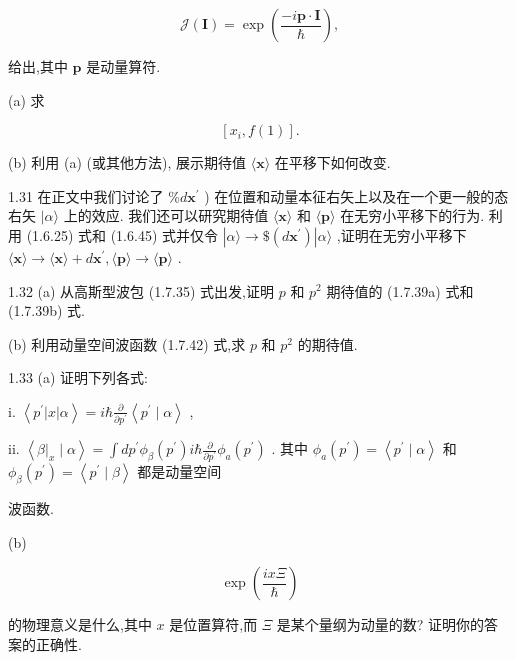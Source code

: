 \documentclass[lang=cn,newtx,10pt,scheme=chinese,thmcnt=section]{elegantbook}
\begin{document}
$$
\mathcal{J}\left( \mathbf{I}\right) = \exp \left( \frac{-i\mathbf{p} \cdot \mathbf{I}}{\hbar }\right) ,
$$

给出,其中 $\mathbf{p}$ 是动量算符.

(a) 求

$$
\left\lbrack {{x}_{i}, f\left( 1\right) }\right\rbrack \text{.}
$$

(b) 利用 (a) (或其他方法), 展示期待值 $\langle \mathbf{x}\rangle$ 在平移下如何改变.

1.31 在正文中我们讨论了 $\% d{\mathbf{x}}^{\prime }$ ) 在位置和动量本征右矢上以及在一个更一般的态右矢 $|\alpha \rangle$ 上的效应. 我们还可以研究期待值 $\langle \mathbf{x}\rangle$ 和 $\langle \mathbf{p}\rangle$ 在无穷小平移下的行为. 利用 (1.6.25) 式和 (1.6.45) 式并仅令 $\left| {\alpha \rangle \rightarrow \$ \left( {d{\mathbf{x}}^{\prime }}\right) }\right| \alpha \rangle$ ,证明在无穷小平移下 $\langle \mathbf{x}\rangle \rightarrow \langle \mathbf{x}\rangle + d{\mathbf{x}}^{\prime },\langle \mathbf{p}\rangle \rightarrow \langle \mathbf{p}\rangle$ .

1.32 (a) 从高斯型波包 (1.7.35) 式出发,证明 $p$ 和 ${p}^{2}$ 期待值的 (1.7.39a) 式和 (1.7.39b) 式.

(b) 利用动量空间波函数 (1.7.42) 式,求 $p$ 和 ${p}^{2}$ 的期待值.

1.33 (a) 证明下列各式:

i. $\left\langle {{p}^{\prime }\left| x\right| \alpha }\right\rangle = i\hbar \frac{\partial }{\partial {p}^{\prime }}\left\langle {{p}^{\prime } \mid \alpha }\right\rangle$ ,

ii. $\left\langle {{\left. \beta \right| }_{x} \mid \alpha }\right\rangle = \int d{p}^{\prime }{\phi }_{\beta }\left( {p}^{\prime }\right) i\hbar \frac{\partial }{\partial {p}^{\prime }}{\phi }_{a}\left( {p}^{\prime }\right)$ . 其中 ${\phi }_{a}\left( {p}^{\prime }\right) = \left\langle {{p}^{\prime } \mid \alpha }\right\rangle$ 和 ${\phi }_{\beta }\left( {p}^{\prime }\right) = \left\langle {{p}^{\prime } \mid \beta }\right\rangle$ 都是动量空间

波函数.

(b)

$$
\exp \left( \frac{ix\Xi }{\hbar }\right)
$$

的物理意义是什么,其中 $x$ 是位置算符,而 $\Xi$ 是某个量纲为动量的数? 证明你的答案的正确性.
\end{document}
